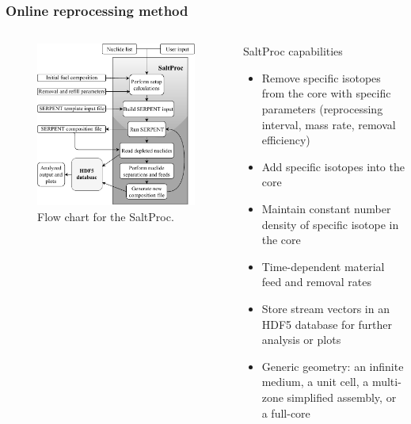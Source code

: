 \begin{frame}
\frametitle{Online reprocessing method}
  \begin{columns}
    \column[t]{6cm}
	\begin{figure}[t]
                \vspace*{-0.35in}
			\hspace{-0.3in}
                 \includegraphics[height=\textwidth]{./images/saltproc_flowchart.pdf}
                \vspace*{-0.05in}
                \caption{Flow chart for the SaltProc.}
      \end{figure}

    \column[t]{6cm}
             \begin{block}{SaltProc capabilities}
               \begin{itemize}             
               \item Remove specific isotopes from the core with specific parameters (reprocessing interval, mass rate, removal efficiency)
               \item Add specific isotopes into the core
               \item Maintain constant number density of specific isotope in the core
	       \item Time-dependent material feed and removal rates
	       \item Store stream vectors in an HDF5 database for further analysis or plots
	       \item Generic geometry: an infinite medium, a unit cell, a multi-zone simplified assembly, or a full-core
               \end{itemize}
               \end{block}
  \end{columns}
\end{frame}

